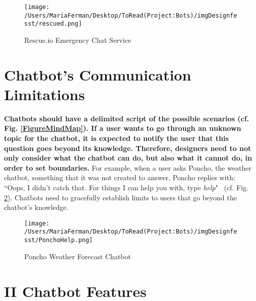\documentclass[a4paper,10pt]{article}
\begin{document}
\begin{figure}
\centering
\texttt{[image: /Users/MariaFerman/Desktop/ToRead(Project:Bots)/imgDesignfesst/rescued.png]}
\caption{Rescue.io Emergency Chat Service}
\label{FigureRescue}
\end{figure}

\section{Chatbot's Communication Limitations}

\textbf{Chatbots should have a delimited script of the possible scenarios (cf. Fig. \ref{FigureMindMap}). If a user wants to go through an unknown topic for the chatbot, it is expected to notify the user that this question goes beyond its knowledge. Therefore, designers need to not only consider what the chatbot can do, but also what it cannot do, in order to set boundaries.} For example, when a user asks Poncho, the weather chatbot, something that it was not created to answer, Poncho replies with: ``Oops, I didn't catch that. For things I can help you with, type \textit{help}"~\cite{HeuristicsWebPage} (cf. Fig. \ref{FigureCommunicationCapabilities}). Chatbots need to gracefully establish limits to users that go beyond the chatbot's knowledge.  

\begin{figure}
\centering
\texttt{[image: /Users/MariaFerman/Desktop/ToRead(Project:Bots)/imgDesignfesst/PonchoHelp.png]}
\caption{Poncho Weather Forecast Chatbot}
\label{FigureCommunicationCapabilities}
\end{figure}

\section*{II Chatbot Features}
\end{document}

